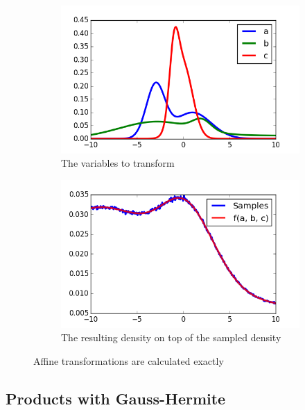 \documentclass[11pt,a4paper]{book}
\begin{document}
\begin{figure}[h]
  \centering
  \begin{subfigure}[t]{0.45\textwidth}
    \centering
    \includegraphics[width=\textwidth]{thesis/operations/affine-vars}
    \caption{The variables to transform}
    \label{fig:affine-vars}
  \end{subfigure}
  \hfill
  \begin{subfigure}[t]{0.45\textwidth}
    \centering
    \includegraphics[width=\textwidth]{thesis/operations/affine-result}
    \caption{The resulting density on top of the sampled density}
    \label{fig:affine-result}
  \end{subfigure}
  \caption{Affine transformations are calculated exactly}
  \label{fig:affine}
\end{figure}

\subsection{Products with Gauss-Hermite}
\end{document}
